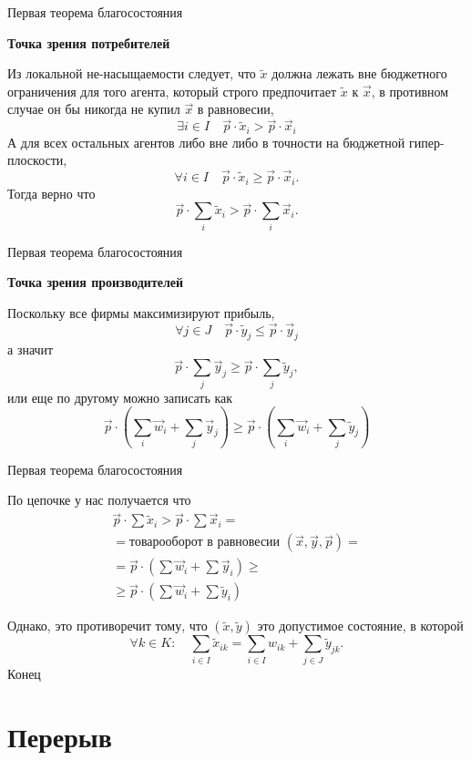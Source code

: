 \documentclass{beamer}
\begin{document}
\begin{frame}{Первая теорема благосостояния}

\textbf{Точка зрения потребителей}

Из локальной не-насыщаемости следует, что $\tilde x$ должна лежать вне бюджетного ограничения для того агента, который строго предпочитает $\tilde x$ к $\vec x$, в противном случае он бы никогда не купил $\vec x$ в равновесии,
$$ \exists i \in I \quad \vec p \cdot \tilde x_i > \vec p \cdot \vec x_i$$
А для всех остальных агентов либо вне либо в точности на бюджетной гипер-плоскости,
$$ \forall i \in I \quad \vec p \cdot \tilde x_i \geqslant \vec p \cdot \vec x_i.$$
Тогда верно что
$$ \vec p \cdot \sum_i \tilde x_i > \vec p \cdot \sum_i \vec x_i.$$
\end{frame}

\begin{frame}{Первая теорема благосостояния}

\textbf{Точка зрения производителей}

Поскольку все фирмы максимизируют прибыль,
$$ \forall j \in J \quad \vec p \cdot \tilde y_j \leqslant \vec p \cdot \vec y_j$$
а значит
$$ \vec p \cdot \sum_j \vec y_j \geqslant \vec p \cdot \sum_j \tilde y_j,$$
или еще по другому можно записать как
$$\vec p \cdot (\sum_i \vec w_i + \sum_j \vec y_j) \geqslant \vec p \cdot ( \sum_i \vec w_i + \sum_j \tilde y_j)$$
\end{frame}

\begin{frame}{Первая теорема благосостояния}

По цепочке у нас получается что
\begin{gather*}
\vec p \cdot \sum \tilde x_i > \vec p \cdot \sum \vec x_i = \\
= \text{товарооборот в равновесии } (\vec x,\vec y, \vec p) = \\
= \vec p \cdot (\sum \vec w_i + \sum \vec y_i) \geqslant \\
\geqslant \vec p \cdot (\sum \vec w_i + \sum \tilde y_i)
\end{gather*}

Однако, это противоречит тому, что $(\tilde x, \tilde y)$ это допустимое состояние, в которой $$ \forall k \in K: \quad \sum_{i \in I} \tilde x_{ik} = \sum_{i \in I} w_{ik} + \sum_{j \in J} \tilde y_{jk}.$$
Конец
\end{frame}

\section{Перерыв}
\end{document}
